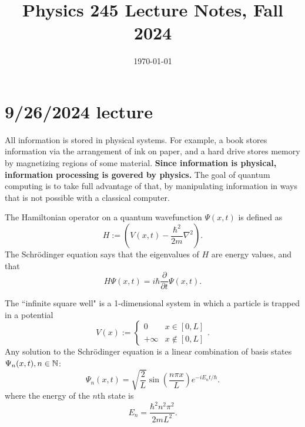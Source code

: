 \documentclass{article}
\date{\today}
\title{Physics 245 Lecture Notes, Fall 2024}
\begin{document}
\maketitle
{}

\tableofcontents

\section{9/26/2024 lecture}
\noindent{}\bigskip\par
All information is stored in physical systems. For example, a book stores information via the arrangement of ink on paper, and a hard drive stores memory by magnetizing regions of some material. \textbf{Since information is physical, information processing is govered by physics.} The goal of quantum computing is to take full advantage of that, by manipulating information in ways that is not possible with a classical computer.
\bigskip
\begin{thm}
    The Hamiltonian operator on a quantum wavefunction $\Psi(x, t)$ is defined as
    \[ H := \left( V(x, t) - \frac{\hbar^2}{2m} \nabla^2 \right). \]
    The Schrödinger equation says that the eigenvalues of $H$ are energy values, and that
    \[ H\Psi(x, t) = i \hbar \frac{\partial}{\partial t} \Psi(x, t). \]
\end{thm}
\begin{example}
    The ``infinite square well" is a 1-dimensional system in which a particle is trapped in a potential
    \[ V(x) := \begin{cases}
        0 & x \in [0, L] \\
        +\infty & x \not\in [0, L]
    \end{cases}. \]
    Any solution to the Schrödinger equation is a linear combination of basis states $\Psi_n(x, t), n \in \mathbb{N}$:
    \[ \Psi_n(x, t) = \sqrt{ \frac{2}{L}} \sin \left( \frac{n \pi x}{L} \right) e^{-i E_n t / \hbar}. \]
    where the energy of the $n$th state is
    \[ E_n = \frac{\hbar^2 n^2 \pi^2}{2 m L^2}. \]
\end{example}
\end{document}
